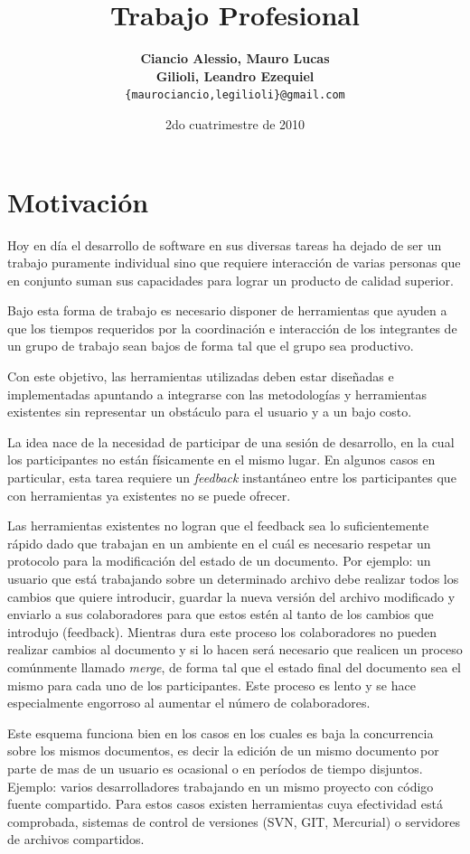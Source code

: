 \documentclass[12pt,a4paper]{article}
\title { \textbf{Trabajo Profesional}}
\date{2do cuatrimestre de 2010}
\author{\textbf{Ciancio Alessio, Mauro Lucas} \\
		\textbf{Gilioli, Leandro Ezequiel}	  \\
		\texttt{\{maurociancio,legilioli\}@gmail.com}
	}
\begin{document}
\maketitle
\tableofcontents
\newpage

	\section{Motivación}
Hoy en día el desarrollo de software en sus diversas tareas ha dejado de ser un trabajo 
puramente individual sino que requiere interacción de varias personas que en conjunto 
suman sus capacidades para lograr un producto de calidad superior.

Bajo esta forma de trabajo es necesario disponer de herramientas que ayuden a que los tiempos
requeridos por la coordinación e interacción de los integrantes de un grupo de trabajo sean bajos
de forma tal que el grupo sea productivo.

Con este objetivo, las herramientas utilizadas deben estar diseñadas e implementadas apuntando a
integrarse con las metodologías y herramientas existentes sin representar un obstáculo para el usuario
y a un bajo costo.

La idea nace de la necesidad de participar de una sesión de desarrollo, en la cual los participantes
no están físicamente en el mismo lugar. En algunos casos en particular, esta tarea requiere un
\textit{feedback} instantáneo entre los participantes que con herramientas ya existentes no se puede 
ofrecer.

Las herramientas existentes no logran que el feedback sea lo suficientemente rápido dado que trabajan
en un ambiente en el cuál es necesario respetar un protocolo para la modificación del estado de un 
documento. Por ejemplo: un usuario que está trabajando sobre un determinado archivo debe realizar todos
los cambios que quiere introducir, guardar la nueva versión del archivo modificado y enviarlo a sus
colaboradores para que estos estén al tanto de los cambios que introdujo (feedback). Mientras dura
este proceso los colaboradores no pueden realizar cambios al documento y si lo hacen será necesario
que realicen un proceso comúnmente llamado \textit{merge}, de forma tal que el estado final del documento 
sea el mismo para cada uno de los participantes. Este proceso es lento y se hace especialmente engorroso
al aumentar el número de colaboradores.

Este esquema funciona bien en los casos en los cuales es baja la concurrencia sobre los mismos documentos,
es decir la edición de un mismo documento por parte de mas de un usuario es ocasional o en períodos de
tiempo disjuntos. Ejemplo: varios desarrolladores trabajando en un mismo proyecto con código fuente
compartido. Para estos casos existen herramientas cuya efectividad está comprobada, sistemas de control
de versiones (SVN, GIT, Mercurial) o servidores de archivos compartidos.
\end{document}
